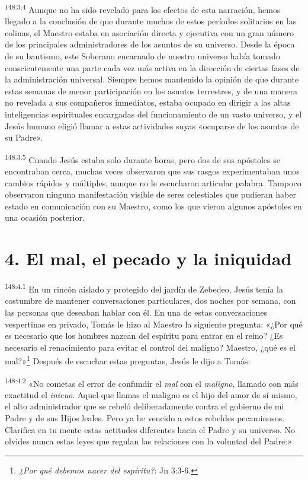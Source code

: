 \par
\textsuperscript{148:3.4} Aunque no ha sido revelado para los efectos de esta narración, hemos llegado a la conclusión de que durante muchos de estos períodos solitarios en las colinas, el Maestro estaba en asociación directa y ejecutiva con un gran número de los principales administradores de los asuntos de su universo. Desde la época de su bautismo, este Soberano encarnado de nuestro universo había tomado conscientemente una parte cada vez más activa en la dirección de ciertas fases de la administración universal. Siempre hemos mantenido la opinión de que durante estas semanas de menor participación en los asuntos terrestres, y de una manera no revelada a sus compañeros inmediatos, estaba ocupado en dirigir a las altas inteligencias espirituales encargadas del funcionamiento de un vasto universo, y el Jesús humano eligió llamar a estas actividades suyas «ocuparse de los asuntos de su Padre».

\par
\textsuperscript{148:3.5} Cuando Jesús estaba solo durante horas, pero dos de sus apóstoles se encontraban cerca, muchas veces observaron que sus rasgos experimentaban unos cambios rápidos y múltiples, aunque no le escucharon articular palabra. Tampoco observaron ninguna manifestación visible de seres celestiales que pudieran haber estado en comunicación con su Maestro, como los que vieron algunos apóstoles en una ocasión posterior.

\section*{4. El mal, el pecado y la iniquidad}
\par
\textsuperscript{148:4.1} En un rincón aislado y protegido del jardín de Zebedeo, Jesús tenía la costumbre de mantener conversaciones particulares, dos noches por semana, con las personas que deseaban hablar con él. En una de estas conversaciones vespertinas en privado, Tomás le hizo al Maestro la siguiente pregunta: «¿Por qué es necesario que los hombres nazcan del espíritu para entrar en el reino? ¿Es necesario el renacimiento para evitar el control del maligno? Maestro, ¿qué es el mal?»\footnote{\textit{¿Por qué debemos nacer del espíritu?}: Jn 3:3-6.} Después de escuchar estas preguntas, Jesús le dijo a Tomás:

\par
\textsuperscript{148:4.2} «No cometas el error de confundir el \textit{mal} con el \textit{maligno}, llamado con más exactitud el \textit{inicuo}. Aquel que llamas el maligno es el hijo del amor de sí mismo, el alto administrador que se rebeló deliberadamente contra el gobierno de mi Padre y de sus Hijos leales. Pero ya he vencido a estos rebeldes pecaminosos. Clarifica en tu mente estas actitudes diferentes hacia el Padre y su universo. No olvides nunca estas leyes que regulan las relaciones con la voluntad del Padre:»


